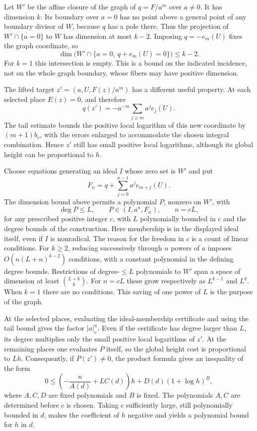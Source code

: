 Let $W'$ be the affine closure of the graph of $q=F/a^m$ over $a\ne0$.
It has dimension $k$.  Its boundary over $a=0$ has no point above a general
point of any boundary divisor of $W$, because $q$ has a pole there.
Thus the projection of $W'\cap\{a=0\}$ to $W$ has dimension at most
$k-2$.  Imposing $q=-e_m(U)$ fixes the graph coordinate, so
\[
 \dim\bigl(W'\cap\{a=0,\ q+e_m(U)=0\}\bigr)\leq k-2.
\]
For $k=1$ this intersection is empty.  This is a bound on the indicated
incidence, not on the whole graph boundary, whose fibers may have
positive dimension.

The lifted target $z'=(a,U,F(z)/a^m)$ has a different useful property.
At each selected place $E(z)=0$, and therefore
\[
 q(z')=-a^{-m}\sum_{j\geq m}a^je_j(U).
\]
The tail estimate bounds the positive local logarithm of this new
coordinate by $(m+1)b_v$, with the errors enlarged to accommodate the
chosen integral combination.  Hence $z'$ still has small positive
local logarithms, although its global height can be proportional to $h$.

Choose equations generating an ideal $I$ whose zero set is $W'$ and put
\[
 F_n=q+\sum_{j=0}^{n-1}a^je_{m+j}(U).
\]
The dimension bound above permits a polynomial $P$, nonzero on $W'$,
with
\[
 \deg P\leq L,\qquad P\in(I,a^n,F_n),\qquad n=cL,
\]
for any prescribed positive integer $c$, with $L$ polynomially bounded
in $c$ and the degree bounds of the construction.  Here membership is
in the displayed ideal itself, even if $I$ is nonradical.  The reason
for the freedom in $c$ is a count of linear conditions.  For $k\geq2$,
reducing successively through $n$ powers of $a$ imposes
$O(n(L+n)^{k-2})$ conditions, with a constant polynomial in the defining
degree bounds.  Restrictions of degree-$\leq L$ polynomials to $W'$
span a space of dimension at least $\binom{L+k}{k}$.  For $n=cL$ these
grow respectively as $L^{k-1}$ and $L^k$.  When $k=1$ there are no
conditions.  This saving of one power of $L$ is the purpose of the graph.

At the selected places, evaluating the ideal-membership certificate and
using the tail bound gives the factor $|a|_v^n$.  Even if the certificate
has degree larger than $L$, its degree multiplies only the small
positive local logarithms of $z'$.  At the remaining places one evaluates
$P$ itself, so the global height cost is proportional to $Lh$.
Consequently, if $P(z')\ne0$, the product formula gives an inequality
of the form
\[
 0\leq\left(-\frac n{A(d)}+L C(d)\right)h
        +D(d)(1+\log h)^B,
\]
where $A,C,D$ are fixed polynomials and $B$ is fixed.  The polynomials
$A,C$ are determined before $c$ is chosen.  Taking $c$ sufficiently
large, still polynomially bounded in $d$, makes the coefficient of $h$
negative and yields a polynomial bound for $h$ in $d$.

